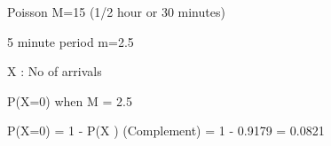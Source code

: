 Poisson 
M=15
(1/2 hour or 30 minutes)

5 minute period 
m=2.5 

X : No of arrivals

P(X=0) when M = 2.5

P(X=0) = 1 - P(X ) (Complement)
= 1 - 0.9179
= 0.0821
